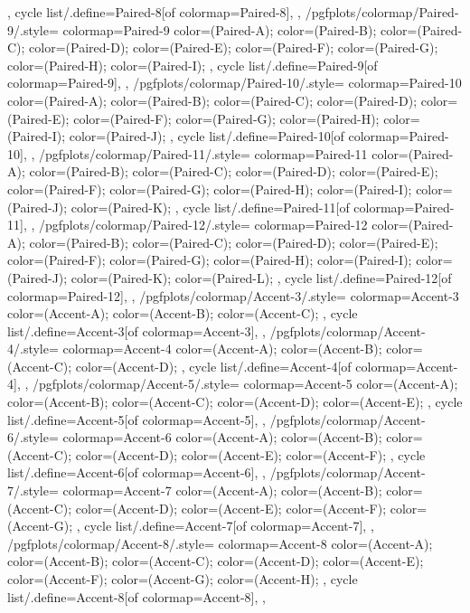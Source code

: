{{{    },
    cycle list/.define={Paired-8}{[of colormap=Paired-8]},
  },
  /pgfplots/colormap/Paired-9/.style={
    colormap={Paired-9}{
      color=(Paired-A);
      color=(Paired-B);
      color=(Paired-C);
      color=(Paired-D);
      color=(Paired-E);
      color=(Paired-F);
      color=(Paired-G);
      color=(Paired-H);
      color=(Paired-I);
    },
    cycle list/.define={Paired-9}{[of colormap=Paired-9]},
  },
  /pgfplots/colormap/Paired-10/.style={
    colormap={Paired-10}{
      color=(Paired-A);
      color=(Paired-B);
      color=(Paired-C);
      color=(Paired-D);
      color=(Paired-E);
      color=(Paired-F);
      color=(Paired-G);
      color=(Paired-H);
      color=(Paired-I);
      color=(Paired-J);
    },
    cycle list/.define={Paired-10}{[of colormap=Paired-10]},
  },
  /pgfplots/colormap/Paired-11/.style={
    colormap={Paired-11}{
      color=(Paired-A);
      color=(Paired-B);
      color=(Paired-C);
      color=(Paired-D);
      color=(Paired-E);
      color=(Paired-F);
      color=(Paired-G);
      color=(Paired-H);
      color=(Paired-I);
      color=(Paired-J);
      color=(Paired-K);
    },
    cycle list/.define={Paired-11}{[of colormap=Paired-11]},
  },
  /pgfplots/colormap/Paired-12/.style={
    colormap={Paired-12}{
      color=(Paired-A);
      color=(Paired-B);
      color=(Paired-C);
      color=(Paired-D);
      color=(Paired-E);
      color=(Paired-F);
      color=(Paired-G);
      color=(Paired-H);
      color=(Paired-I);
      color=(Paired-J);
      color=(Paired-K);
      color=(Paired-L);
    },
    cycle list/.define={Paired-12}{[of colormap=Paired-12]},
  },
  /pgfplots/colormap/Accent-3/.style={
    colormap={Accent-3}{
      color=(Accent-A);
      color=(Accent-B);
      color=(Accent-C);
    },
    cycle list/.define={Accent-3}{[of colormap=Accent-3]},
  },
  /pgfplots/colormap/Accent-4/.style={
    colormap={Accent-4}{
      color=(Accent-A);
      color=(Accent-B);
      color=(Accent-C);
      color=(Accent-D);
    },
    cycle list/.define={Accent-4}{[of colormap=Accent-4]},
  },
  /pgfplots/colormap/Accent-5/.style={
    colormap={Accent-5}{
      color=(Accent-A);
      color=(Accent-B);
      color=(Accent-C);
      color=(Accent-D);
      color=(Accent-E);
    },
    cycle list/.define={Accent-5}{[of colormap=Accent-5]},
  },
  /pgfplots/colormap/Accent-6/.style={
    colormap={Accent-6}{
      color=(Accent-A);
      color=(Accent-B);
      color=(Accent-C);
      color=(Accent-D);
      color=(Accent-E);
      color=(Accent-F);
    },
    cycle list/.define={Accent-6}{[of colormap=Accent-6]},
  },
  /pgfplots/colormap/Accent-7/.style={
    colormap={Accent-7}{
      color=(Accent-A);
      color=(Accent-B);
      color=(Accent-C);
      color=(Accent-D);
      color=(Accent-E);
      color=(Accent-F);
      color=(Accent-G);
    },
    cycle list/.define={Accent-7}{[of colormap=Accent-7]},
  },
  /pgfplots/colormap/Accent-8/.style={
    colormap={Accent-8}{
      color=(Accent-A);
      color=(Accent-B);
      color=(Accent-C);
      color=(Accent-D);
      color=(Accent-E);
      color=(Accent-F);
      color=(Accent-G);
      color=(Accent-H);
    },
    cycle list/.define={Accent-8}{[of colormap=Accent-8]},
  },
}

